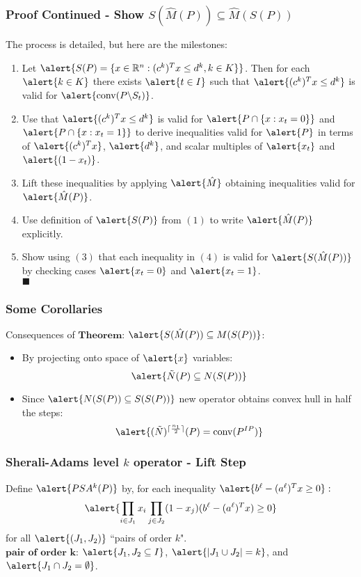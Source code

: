 \documentclass{beamer}
\DeclarePairedDelimiter{\ceil}{\lceil}{\rceil}
\DeclareMathOperator{\conv}{conv}
\begin{document}
\begin{frame}
\frametitle{Proof Continued - Show $S(\hat{M}(P)) \subseteq \hat{M}(S(P))$}
The process is detailed, but here are the milestones:
\begin{enumerate}
\item Let $\alert{S(P) = \{ x \in \R^n : (c^k)^T x \leq d^k, k \in K \}}$. Then for each $\alert{k \in K}$ there exists $\alert{t \in I}$ such that $\alert{(c^k)^T x \leq d^k}$ is valid for $\alert{\conv(P \backslash S_t)}$.
\item Use that $\alert{(c^k)^T x \leq d^k}$ is valid for $\alert{P \cap \{x:x_t = 0\}}$ and $\alert{P \cap \{x:x_t=1\}}$ to derive inequalities valid for $\alert{P}$ in terms of $\alert{(c^k)^T x}$, $\alert{d^k}$, and scalar multiples of $\alert{x_t}$ and $\alert{(1-x_t)}$.
\item Lift these inequalities by applying $\alert{\hat{M}}$ obtaining inequalities valid for $\alert{\hat{M}(P)}$.
\item Use definition of $\alert{S(P)}$ from $(1)$ to write $\alert{\hat{M}(P)}$ explicitly.
\item Show using $(3)$ that each inequality in $(4)$ is valid for $\alert{S(\hat{M}(P))}$ by checking cases $\alert{x_t = 0}$ and $\alert{x_t = 1}$.\\$\blacksquare$
\end{enumerate}
\end{frame}

\begin{frame}
\frametitle{Some Corollaries}
Consequences of $\textbf{Theorem:}$ $\alert{S(\hat{M}(P)) \subseteq M(S(P))}$:
\begin{itemize}
\item By projecting onto space of $\alert{x}$ variables: $$\alert{\tilde{N}(P) \subseteq N(S(P))}$$
\item Since $\alert{N(S(P)) \subseteq S(S(P))}$ new operator obtains convex hull in half the steps: $$\alert{(\tilde{N})^{\ceil{\frac{n_1}{2}}}(P) = \conv(P^{IP})}$$
\end{itemize}
\end{frame}

\begin{frame}
\frametitle{Sherali-Adams level $k$ operator - Lift Step}
Define $\alert{PSA^k(P)}$ by, for each inequality $\alert{b^\ell - (a^\ell)^Tx \geq 0}:$
$$\alert{\prod_{i \in J_1} x_i \prod_{j \in J_2} (1 - x_j) (b^\ell - (a^\ell)^Tx) \geq 0}$$
for all $\alert{(J_1, J_2)}$ ``pairs of order $k$".\\
$\textbf{pair of order k:}$ $\alert{J_1, J_2 \subseteq I}$, $\alert{|J_1 \cup J_2| = k}$, and $\alert{J_1 \cap J_2 = \emptyset}$.
\end{frame}
\end{document}
